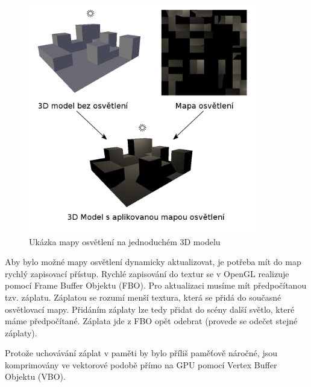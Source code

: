 \documentclass[11pt,twoside,a4paper]{book}
\begin{document}
\begin{center}
\begin{figure}[h!]
\includegraphics[width=100mm]{figures/lmapply.png}
\caption{Ukázka mapy osvětlení na jednoduchém 3D modelu}
\end{figure}
\end{center}

Aby bylo možné mapy osvětlení dynamicky aktualizovat, je potřeba mít do map rychlý zapisovací přístup. Rychlé zapisování do textur se v OpenGL realizuje pomocí Frame Buffer Objektu (FBO). Pro aktualizaci musíme mít předpočítanou tzv. záplatu. Záplatou se rozumí menší textura, která se přidá do současné osvětlovací mapy. Přidáním záplaty lze tedy přidat do scény další světlo, které máme předpočítané. Záplata jde z FBO opět odebrat (provede se odečet stejné záplaty).

Protože uchovávání záplat v paměti by bylo příliš paměťově náročné, jsou komprimovány ve vektorové podobě přímo na GPU pomocí Vertex Buffer Objektu (VBO). 
\newpage
\end{document}
